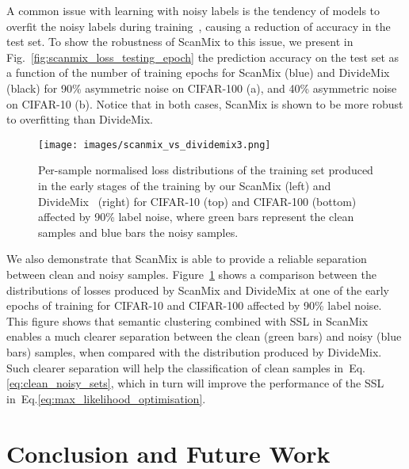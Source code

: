\documentclass[review]{elsarticle}
\theoremstyle{plain}
\begin{document}
A common issue with learning with noisy labels is the tendency of models to overfit the noisy labels during training~\citep{liu2020early,ma2018dimensionality}, causing a reduction of accuracy in the test set. To show the robustness of ScanMix to this issue, we present in Fig.~\ref{fig:scanmix_loss_testing_epoch} the prediction accuracy on the test set as a function of the number of training epochs for ScanMix (blue) and DivideMix (black) for 90\% asymmetric noise on CIFAR-100 (a), and 40\% asymmetric noise on CIFAR-10 (b). Notice that in both cases, ScanMix is shown to be more robust to overfitting than DivideMix.


\begin{figure}
\centering
  \texttt{[image: images/scanmix\_vs\_dividemix3.png]}
  \caption{Per-sample normalised loss distributions of the training set produced in the early stages of the training by our ScanMix (left) and DivideMix~\citep{li2020dividemix} (right) for CIFAR-10 (top) and CIFAR-100 (bottom) affected by 90\% label noise, where green bars represent the clean samples and blue bars the noisy samples.}
  \label{fig:scanmix_vs_li2020dividemix}
\end{figure}


We also demonstrate that ScanMix is able to provide a reliable separation between clean and noisy samples.
Figure~\ref{fig:scanmix_vs_li2020dividemix} shows a comparison between the distributions of losses produced by ScanMix and DivideMix at one of the early epochs of training for CIFAR-10 and CIFAR-100 affected by 90\% label noise.  This figure shows that semantic clustering combined with SSL in ScanMix enables a much clearer separation between the clean (green bars) and noisy (blue bars) samples, when compared with the distribution produced by DivideMix.  Such clearer separation will help the classification of clean samples in~Eq.\ref{eq:clean_noisy_sets}, which in turn will improve the performance of the SSL in~Eq.\ref{eq:max_likelihood_optimisation}.



\section{Conclusion and Future Work}
\label{sec:conclusions}
\end{document}
